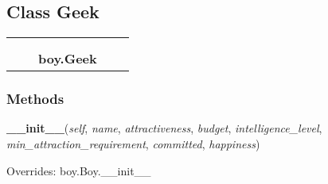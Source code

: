 

\subsection{Class Geek}

    \label{boy:Geek}
\begin{tabular}{cccccc}
\multicolumn{2}{r}{\settowidth{\BCL}{boy.Boy}\multirow{2}{\BCL}{boy.Boy}}
&&
  \\\cline{3-3}
  &&\multicolumn{1}{c|}{}
&&
  \\
&&\multicolumn{2}{l}{\textbf{boy.Geek}}
\end{tabular}



  \subsubsection{Methods}

    \vspace{0.5ex}

\hspace{.8\funcindent}\begin{boxedminipage}{\funcwidth}

    \raggedright \textbf{\_\_init\_\_}(\textit{self}, \textit{name}, \textit{attractiveness}, \textit{budget}, \textit{intelligence\_level}, \textit{min\_attraction\_requirement}, \textit{committed}, \textit{happiness})

\setlength{\parskip}{2ex}
\setlength{\parskip}{1ex}
      Overrides: boy.Boy.\_\_init\_\_

    \end{boxedminipage}

    \label{boy:Geek:getHappiness}

    \vspace{0.5ex}

